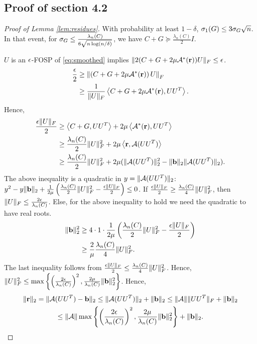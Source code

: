 \subsection{Proof of section 4.2}
\begin{proof}[Proof of Lemma \ref{lem:residues}]
With probability at least $1-\delta$, $\sigma_1(G) \leq 3\sigma_G\sqrt{n} $. In that event, for $\sigma_G \leq \frac{\lambda_{n}(C)}{6\sqrt{n \log(n/\delta)}}$, we have $C+G \succeq \frac{\lambda_{n}(C)}{2}I$.

$U$ is an $\epsilon$-FOSP of \eqref{eq:smoothed} implies $\|2(C+G+2\mu \mathcal{A}^*(\mathbf{r}))U\|_F \leq \epsilon$. \begin{align*}
\frac{\epsilon}{2} &\geq \left\| \left(C+G+2\mu \mathcal{A}^*(\mathbf{r}) \right)U \right\|_F \\
&\geq \frac{1}{\|U\|_F}  \left\langle C+G+2\mu \mathcal{A}^*(\mathbf{r}), UU^T \right\rangle .
\end{align*} Hence, \begin{align*} 
\frac{\epsilon \|U\|_F}{2}  &\geq \left\langle C+G, UU^T \right\rangle + 2\mu\left\langle  \mathcal{A}^*(\mathbf{r}), UU^T \right\rangle  \\
&\geq  \frac{\lambda_n(C)}{2}\|U\|_F^2+2\mu\left\langle \mathbf{r}, \mathcal{A}(UU^T) \right\rangle \\
&\geq \frac{\lambda_n(C)}{2}\|U\|_F^2+2\mu( \|\mathcal{A}(UU^T)\|_2^2 - \|\mathbf{b}\|_2\|\mathcal{A}(UU^T)\|_2).
 \end{align*}
The above inequality is  a quadratic in $y=\|\mathcal{A}(UU^T)\|_2$: $y^2 -y \|\mathbf{b}\|_2 + \frac{1}{2\mu} \left(\frac{\lambda_n(C)}{2}\|U\|_F^2 -\frac{\epsilon \|U\|_F}{2}\right) \leq 0$. If $\frac{\epsilon \|U\|_F}{2} \geq \frac{\lambda_n(C)}{4}\|U\|_F^2$, then  $\|U\| _F \leq \frac{2\epsilon} {\lambda_n(C)}$. Else, for the above inequality to hold we need the quadratic to have real roots.
\begin{align*}
\|\mathbf{b}\|_2^2 &\geq 4 \cdot 1 \cdot \frac{1}{2\mu} \left( \frac{\lambda_n(C)}{2}\|U\|_F^2 -\frac{\epsilon \|U\|_F}{2} \right) \\
&\geq \frac{2}{\mu} \frac{\lambda_n(C)}{4}\|U\|_F^2.
\end{align*}
The last inequality follows from  $\frac{\epsilon \|U\|_F}{2} \leq \frac{\lambda_n(C)}{4}\|U\|_F^2$. Hence, $\|U\|_F^2 \leq \max \left \{ \left( \frac{2\epsilon} {\lambda_n(C)}\right)^2, \frac{2\mu}{\lambda_n(C)} \|\mathbf{b}\|_2^2 \right \}$. Hence,
\begin{multline*}
\|\mathbf{r}\|_2 = \| \mathcal{A}(UU^T) -\mathbf{b}\|_2 \leq \|\mathcal{A}(UU^T)\|_2 +\|\mathbf{b}\|_2 \leq \|\mathcal{A}\| \|UU^T\|_F +\|\mathbf{b}\|_2 \\ \leq \|\mathcal{A}\| \max \left \{ \left( \frac{2\epsilon} {\lambda_n(C)}\right)^2, \frac{2\mu}{\lambda_n(C)} \|\mathbf{b}\|_2^2 \right \}+\|\mathbf{b}\|_2.
\end{multline*}
\end{proof}



